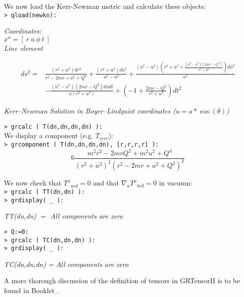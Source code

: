 \documentclass{article}
\begin{document}
{We now load the Kerr-Newman metric and calculate these objects:\\

\noindent\texttt{> qload(newkn):}
\begin{center}\textit{
  Coordinates:\\
  $x^a = [\ r\ u\ \phi\ t\ ]$\\
  Line element}
\end{center}
\begin{align*}
  ds^2 = & \frac{(r^2 + u^2)dr^2}{r^2 - 2mr + a^2 + Q^2}
    + \frac{(r^2 + u^2)du^2}{a^2 - u^2}
    + \frac{(a^2 - u^2)\left(r^2 + a^2 + \frac{(a^2 - u^2)
      (2mr-Q^2)}{r^2 + u^2}\right)d\phi^2}{a^2}\\
    & -\frac{(a^2-u^2)(2mr-Q^2)d\phi dt}{a(r^2+u^2)}
    + \left( -1 + \frac{2mr - Q^2}{r^2 + u^2}\right) dt^2
\end{align*}
\begin{center}
  \textit{Kerr--Newman Solution in Boyer--Lindquist coordinates 
  ($u=a\ast \cos(\theta)$)}\\
\end{center}

\noindent\texttt{> grcalc ( T(dn,dn,dn,dn) ):}\\

\noindent We display a component (e.g. $T_{rrrr}$):\\

\noindent\texttt{> grcomponent ( T(dn,dn,dn,dn), [r,r,r,r] ):}
\[
  6\frac{m^2 r^2 - 2mrQ^2 + m^2 u^2 + Q^4}
    {(r^2 + u^2)^2(r^2 - 2mr + a^2 + Q^2)^2}
\]

\noindent We now check that $T^a{}_{acd}=0$ and that 
$\nabla_a T^a{}_{bcd}=0$ in vacuum:\\

\noindent\texttt{> grcalc ( TT(dn,dn) ):}\\
\texttt{> grdisplay( \_ ):}
\begin{center}
  \textit{TT(dn,dn) $=$ All components are zero}
\end{center}
\texttt{> Q:=0:}\\
\texttt{> grcalc ( TC(dn,dn,dn) ):}\\
\texttt{> grdisplay( \_ ):}
\begin{center}
  \textit{TC(dn,dn,dn) = All components are zero}
\end{center}

A more thorough discussion of the definition of tensors in GRTensorII is
to be found in Booklet \grDefRef.
%
\pagebreak
}
\end{document}
